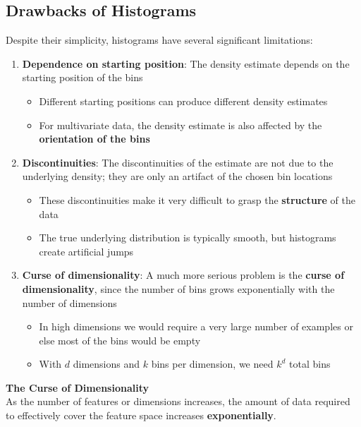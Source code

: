 \documentclass[11pt,a4paper]{article}
\theoremstyle{definition}
\theoremstyle{plain}
\theoremstyle{remark}
\begin{document}
\subsection{Drawbacks of Histograms}

Despite their simplicity, histograms have several significant limitations:

\begin{enumerate}
    \item \textbf{Dependence on starting position}: The density estimate depends on the starting position of the bins
    \begin{itemize}
        \item Different starting positions can produce different density estimates
        \item For multivariate data, the density estimate is also affected by the \textbf{orientation of the bins}
    \end{itemize}
    
    \item \textbf{Discontinuities}: The discontinuities of the estimate are not due to the underlying density; they are only an artifact of the chosen bin locations
    \begin{itemize}
        \item These discontinuities make it very difficult to grasp the \textbf{structure} of the data
        \item The true underlying distribution is typically smooth, but histograms create artificial jumps
    \end{itemize}
    
    \item \textbf{Curse of dimensionality}: A much more serious problem is the \textbf{curse of dimensionality}, since the number of bins grows exponentially with the number of dimensions
    \begin{itemize}
        \item In high dimensions we would require a very large number of examples or else most of the bins would be empty
        \item With $d$ dimensions and $k$ bins per dimension, we need $k^d$ total bins
    \end{itemize}
\end{enumerate}

\begin{center}
\colorbox{red!15}{\parbox{0.9\textwidth}{
\textbf{The Curse of Dimensionality}\\[0.2cm]
As the number of features or dimensions increases, the amount of data required to effectively cover the feature space increases \textbf{exponentially}.
}}
\end{center}
\end{document}

